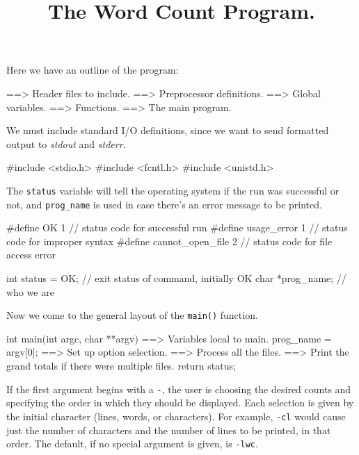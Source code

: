 \documentclass[11pt,a4paper]{article}
\title{The Word Count Program.}
\begin{document}
\maketitle

Here we have an outline of the program:

\begin{code}[language=c]
==> Header files to include.
==> Preprocessor definitions.
==> Global variables.
==> Functions.
==> The main program.
\end{code}

We must include standard I/O definitions, since we want to send formatted output to \emph{stdout}
and \emph{stderr}.

\begin{code}[name=Header files to include]
#include <stdio.h>
#include <fcntl.h>
#include <unistd.h>
\end{code}

The \texttt{status} variable will tell the operating system if the run was successful or not, and
\texttt{prog\_name} is used in case there's an error message to be printed.

\begin{code}[name=Preprocessor definitions]
#define OK 1                // status code for successful run
#define usage_error 1       // status code for improper syntax
#define cannot_open_file 2  // status code for file access error
\end{code}

\begin{code}[name={Global variables}]
int status = OK;  // exit status of command, initially OK
char *prog_name;  // who we are
\end{code}

Now we come to the general layout of the \texttt{main()} function.

\begin{code}[language=c,name=The main program]
int main(int argc, char **argv)
{
    ==> Variables local to main.
    prog_name = argv[0];
    ==> Set up option selection.
    ==> Process all the files.
    ==> Print the grand totals if there were multiple files.
    return status;
}
\end{code}

If the first argument begins with a \texttt{-}, the user is choosing the desired counts and
specifying the order in which they should be displayed. Each selection is given by the initial
character  (lines, words, or characters). For example, \texttt{-cl} would cause just the number of
characters and the number of lines to be printed, in that order. The default, if no special argument
is given, is \texttt{-lwc}.
\end{document}
